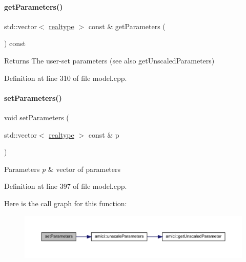 \paragraph{\texorpdfstring{get\+Parameters()}{getParameters()}}
{\footnotesize\ttfamily std\+::vector$<$ \mbox{\hyperlink{namespaceamici_a1bdce28051d6a53868f7ccbf5f2c14a3}{realtype}} $>$ const  \& get\+Parameters (\begin{DoxyParamCaption}{ }\end{DoxyParamCaption}) const}

\begin{DoxyReturn}{Returns}
The user-\/set parameters (see also get\+Unscaled\+Parameters) 
\end{DoxyReturn}


Definition at line 310 of file model.\+cpp.

\mbox{\label{classamici_1_1_model_af1e95f6479d442fcb4c63d16763d4acd}} 
\paragraph{\texorpdfstring{set\+Parameters()}{setParameters()}}
{\footnotesize\ttfamily void set\+Parameters (\begin{DoxyParamCaption}\item[{std\+::vector$<$ \mbox{\hyperlink{namespaceamici_a1bdce28051d6a53868f7ccbf5f2c14a3}{realtype}} $>$ const \&}]{p }\end{DoxyParamCaption})}


\begin{DoxyParams}{Parameters}
{\em p} & vector of parameters \\
\hline
\end{DoxyParams}


Definition at line 397 of file model.\+cpp.

Here is the call graph for this function\+:
\nopagebreak
\begin{figure}[H]
\begin{center}
\leavevmode
\includegraphics[width=350pt]{classamici_1_1_model_af1e95f6479d442fcb4c63d16763d4acd_cgraph}
\end{center}
\end{figure}
\mbox{\label{classamici_1_1_model_a76f62d983fb3842cb695681f7ed9a9f0}} 
